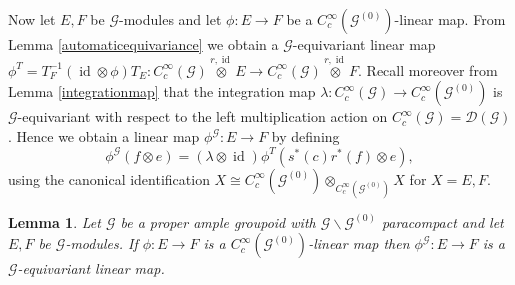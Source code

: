 \documentclass{amsart}
\newtheorem{lemma}[thm]{Lemma}
\newcommand{\G}{\mathcal{G}}
\newcommand{\DG}{\mathcal{D}(\mathcal{G})}
\newcommand{\ccinfty}{C_c^\infty}
\DeclareMathOperator{\id}{id}
\begin{document}
Now let $ E, F $ be $ \G $-modules and let $ \phi: E \rightarrow F $ be a $ \ccinfty(\G^{(0)}) $-linear map. From Lemma \ref{automaticequivariance} we obtain a $ \G $-equivariant linear map $ \phi^T = T_F^{-1}(\id \otimes \phi) T_E: \ccinfty(\G) \stackrel{r,\id}{\otimes} E \rightarrow  \ccinfty(\G) \stackrel{r,\id}{\otimes} F $. 
Recall moreover from Lemma \ref{integrationmap} that the integration map $ \lambda: \ccinfty(\G) \rightarrow \ccinfty(\G^{(0)}) $ is $ \G $-equivariant with respect to the left multiplication action on $ \ccinfty(\G) = \DG $. 
Hence we obtain a linear map $ \phi^\G: E \rightarrow F $ by defining 
$$ 
\phi^\G(f \otimes e) = (\lambda \otimes \id) \phi^T(s^*(c) r^*(f) \otimes e), 
$$
using the canonical identification $ X \cong \ccinfty(\G^{(0)}) \otimes_{\ccinfty(\G^{(0)})} X $ for $ X = E,F $. 

\begin{lemma} \label{averaging}
Let $ \G $ be a proper ample groupoid with $ \G \backslash \G^{(0)} $ paracompact and let $ E, F $ be $ \G $-modules. If 
$ \phi: E \rightarrow F $ is a $ \ccinfty(\G^{(0)}) $-linear map then $ \phi^\G: E \rightarrow F $ is a $ \G $-equivariant linear map. 
\end{lemma}
\end{document}
